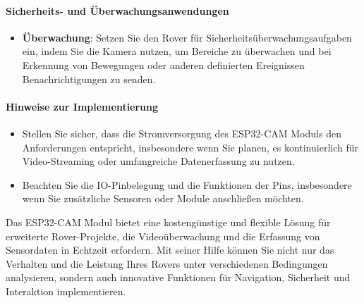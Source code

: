 \documentclass{vorlage-design-main}
\begin{document}
\hypertarget{sicherheits--und-uxfcberwachungsanwendungen}{%
\paragraph{Sicherheits- und
Überwachungsanwendungen}\label{sicherheits--und-ueberwachungsanwendungen}}

\begin{itemize}

\item
  \textbf{Überwachung}: Setzen Sie den Rover für
  Sicherheitsüberwachungsaufgaben ein, indem Sie die Kamera nutzen, um
  Bereiche zu überwachen und bei Erkennung von Bewegungen oder anderen
  definierten Ereignissen Benachrichtigungen zu senden.
\end{itemize}

\hypertarget{hinweise-zur-implementierung}{%
\paragraph{Hinweise zur
Implementierung}\label{hinweise-zur-implementierung}}

\begin{itemize}

\item
  Stellen Sie sicher, dass die Stromversorgung des ESP32-CAM Moduls den
  Anforderungen entspricht, insbesondere wenn Sie planen, es
  kontinuierlich für Video-Streaming oder umfangreiche Datenerfassung zu
  nutzen.
\item
  Beachten Sie die IO-Pinbelegung und die Funktionen der Pins,
  insbesondere wenn Sie zusätzliche Sensoren oder Module anschließen
  möchten.
\end{itemize}

Das ESP32-CAM Modul bietet eine kostengünstige und flexible Lösung für
erweiterte Rover-Projekte, die Videoüberwachung und die Erfassung von
Sensordaten in Echtzeit erfordern. Mit seiner Hilfe können Sie nicht nur
das Verhalten und die Leistung Ihres Rovers unter verschiedenen
Bedingungen analysieren, sondern auch innovative Funktionen für
Navigation, Sicherheit und Interaktion implementieren. %


\clearpage
\printbibliography
\end{document}
